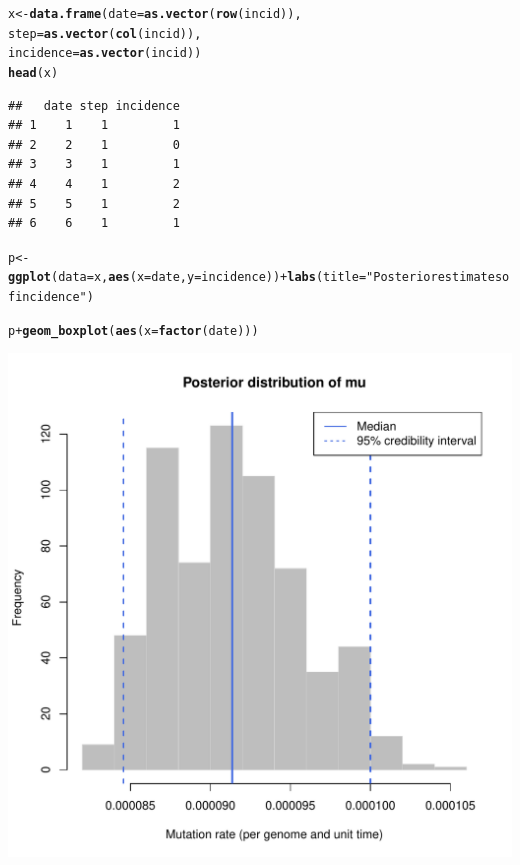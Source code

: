 \documentclass{article}\usepackage[]{graphicx}\usepackage[]{color}
\makeatletter
\newcommand{\hlstr}[1]{\textcolor[rgb]{0.192,0.494,0.8}{#1}}%
\newcommand{\hlopt}[1]{\textcolor[rgb]{0,0,0}{#1}}%
\newcommand{\hlstd}[1]{\textcolor[rgb]{0.345,0.345,0.345}{#1}}%
\newcommand{\hlkwb}[1]{\textcolor[rgb]{0.69,0.353,0.396}{#1}}%
\newcommand{\hlkwc}[1]{\textcolor[rgb]{0.333,0.667,0.333}{#1}}%
\newcommand{\hlkwd}[1]{\textcolor[rgb]{0.737,0.353,0.396}{\textbf{#1}}}%
\newenvironment{kframe}{%
 \def\at@end@of@kframe{}%
 \ifinner\ifhmode%
  \def\at@end@of@kframe{\end{minipage}}%
  \begin{minipage}{\columnwidth}%
 \fi\fi%
 \def\FrameCommand##1{\hskip\@totalleftmargin \hskip-\fboxsep
 \colorbox{shadecolor}{##1}\hskip-\fboxsep
     \hskip-\linewidth \hskip-\@totalleftmargin \hskip\columnwidth}%
 \MakeFramed {\advance\hsize-\width
   \@totalleftmargin\z@ \linewidth\hsize
   \@setminipage}}%
 {\par\unskip\endMakeFramed%
 \at@end@of@kframe}
\newenvironment{knitrout}{}{} %
\makeatother
\begin{document}
\begin{knitrout}
\color{fgcolor}\begin{kframe}
\begin{alltt}
\hlstd{x} \hlkwb{<-} \hlkwd{data.frame}\hlstd{(}\hlkwc{date}\hlstd{=}\hlkwd{as.vector}\hlstd{(}\hlkwd{row}\hlstd{(incid)),}
                \hlkwc{step}\hlstd{=}\hlkwd{as.vector}\hlstd{(}\hlkwd{col}\hlstd{(incid)),}
                \hlkwc{incidence}\hlstd{=}\hlkwd{as.vector}\hlstd{(incid))}
\hlkwd{head}\hlstd{(x)}
\end{alltt}
\begin{verbatim}
##   date step incidence
## 1    1    1         1
## 2    2    1         0
## 3    3    1         1
## 4    4    1         2
## 5    5    1         2
## 6    6    1         1
\end{verbatim}
\begin{alltt}
\hlstd{p} \hlkwb{<-} \hlkwd{ggplot}\hlstd{(}\hlkwc{data}\hlstd{=x,} \hlkwd{aes}\hlstd{(}\hlkwc{x}\hlstd{=date,} \hlkwc{y}\hlstd{=incidence))} \hlopt{+} \hlkwd{labs}\hlstd{(}\hlkwc{title}\hlstd{=}\hlstr{"Posterior estimates of incidence"}\hlstd{)}
\end{alltt}
\end{kframe}
\end{knitrout}



\begin{knitrout}
\color{fgcolor}\begin{kframe}
\begin{alltt}
\hlstd{p} \hlopt{+} \hlkwd{geom_boxplot}\hlstd{(}\hlkwd{aes}\hlstd{(}\hlkwc{x}\hlstd{=}\hlkwd{factor}\hlstd{(date)))}
\end{alltt}
\end{kframe}

{\centering \includegraphics[width=.6\textwidth]{figs/unnamed-chunk-43} 

}



\end{knitrout}
\end{document}
